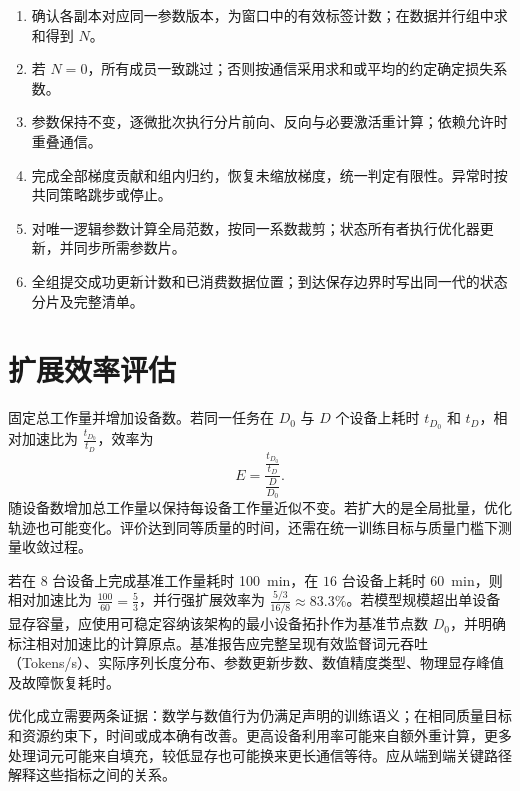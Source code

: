 \documentclass[../textbook.tex]{subfiles}
\begin{document}
\begin{algorithm}[按全局有效目标执行同步更新]
\begin{enumerate}
\item 确认各副本对应同一参数版本，为窗口中的有效标签计数；在数据并行组中求和得到 $N$。
\item 若 $N=0$，所有成员一致跳过；否则按通信采用求和或平均的约定确定损失系数。
\item 参数保持不变，逐微批次执行分片前向、反向与必要激活重计算；依赖允许时重叠通信。
\item 完成全部梯度贡献和组内归约，恢复未缩放梯度，统一判定有限性。异常时按共同策略跳步或停止。
\item 对唯一逻辑参数计算全局范数，按同一系数裁剪；状态所有者执行优化器更新，并同步所需参数片。
\item 全组提交成功更新计数和已消费数据位置；到达保存边界时写出同一代的状态分片及完整清单。
\end{enumerate}
\end{algorithm}

\section{扩展效率评估}

固定总工作量并增加设备数。若同一任务在 $D_0$ 与 $D$ 个设备上耗时 $t_{D_0}$ 和 $t_D$，相对加速比为 $\frac{t_{D_0}}{t_D}$，效率为
\begin{equation}
 E=\frac{\frac{t_{D_0}}{t_D}}{\frac{D}{D_0}}.
\end{equation}
随设备数增加总工作量以保持每设备工作量近似不变。若扩大的是全局批量，优化轨迹也可能变化。评价达到同等质量的时间，还需在统一训练目标与质量门槛下测量收敛过程。

若在 $8$ 台设备上完成基准工作量耗时 \qty{100}{\minute}，在 $16$ 台设备上耗时 \qty{60}{\minute}，则相对加速比为 $\frac{100}{60}=\frac{5}{3}$，并行强扩展效率为 $\frac{5/3}{16/8}\approx 83.3\%$。若模型规模超出单设备显存容量，应使用可稳定容纳该架构的最小设备拓扑作为基准节点数 $D_0$，并明确标注相对加速比的计算原点。基准报告应完整呈现有效监督词元吞吐（Tokens/s）、实际序列长度分布、参数更新步数、数值精度类型、物理显存峰值及故障恢复耗时。

优化成立需要两条证据：数学与数值行为仍满足声明的训练语义；在相同质量目标和资源约束下，时间或成本确有改善。更高设备利用率可能来自额外重计算，更多处理词元可能来自填充，较低显存也可能换来更长通信等待。应从端到端关键路径解释这些指标之间的关系。
\end{document}
